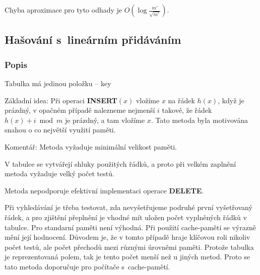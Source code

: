 \documentclass[a4paper,12pt]{article}
\begin{document}
Chyba aproximace pro tyto odhady je $O(\log\frac {m'}{\sqrt {
m'}})$.

\subsection{Hašování s~lineárním přidáváním}

\subsubsection{Popis}

Tabulka má jedinou položku -- key

Základní idea:  Při operaci {\bf INSERT$(x)$} vložíme $
x$ 
na řádek $h(x)$, když je prázdný, v opačném případě 
nalezneme nejmenší $i$ takové, že řádek $h(x)+i\bmod 
m$ je 
prázdný, a tam vložíme $x$. Tato metoda byla motivována snahou o co největší využití paměti. 

Komentář:  Metoda vyžaduje minimální velikost paměti.  

V tabulce se vytvářejí shluky použitých řádků, a proto 
při velkém zaplnění metoda vyžaduje velký počet testů. 
 
Metoda nepodporuje efektivní implementaci operace {\bf DELETE}.  

Při vy\-hle\-dá\-vá\-ní je třeba testovat, zda nevyšetřujeme 
podruhé první vyšetřovaný řádek, a pro zjištění přeplnění je 
vhodné mít uložen počet vyplněných řádků v tabulce. Pro standarní paměti není výhodná. Při použití cache-paměti se výrazně mění její hodnocení. Důvodem je, že v tomto případě hraje klíčovou roli nikoliv počet testů, ale počet přechodů mezi různými úrovněmi paměti. Protože tabulka je reprezentovaná polem, tak je tento počet menší než u jiných metod. Proto se tato metoda doporučuje pro počítače s~cache-pamětí.
\end{document}

